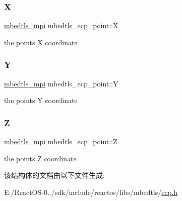 \subsubsection{\texorpdfstring{X}{X}}
{\footnotesize\ttfamily \hyperlink{structmbedtls__mpi}{mbedtls\+\_\+mpi} mbedtls\+\_\+ecp\+\_\+point\+::X}

the point\textquotesingle{}s \hyperlink{class_x}{X} coordinate \mbox{\label{structmbedtls__ecp__point_af8fb56647185a0186c7a3c54eea30a4d}} 
\subsubsection{\texorpdfstring{Y}{Y}}
{\footnotesize\ttfamily \hyperlink{structmbedtls__mpi}{mbedtls\+\_\+mpi} mbedtls\+\_\+ecp\+\_\+point\+::Y}

the point\textquotesingle{}s Y coordinate \mbox{\label{structmbedtls__ecp__point_a83c24649cb4c1ed8aae6449a29d094e5}} 
\subsubsection{\texorpdfstring{Z}{Z}}
{\footnotesize\ttfamily \hyperlink{structmbedtls__mpi}{mbedtls\+\_\+mpi} mbedtls\+\_\+ecp\+\_\+point\+::Z}

the point\textquotesingle{}s Z coordinate 

该结构体的文档由以下文件生成\+:\begin{DoxyCompactItemize}
\item 
E\+:/\+React\+O\+S-\/0../sdk/include/reactos/libs/mbedtls/\hyperlink{ecp_8h}{ecp.\+h}\end{DoxyCompactItemize}
